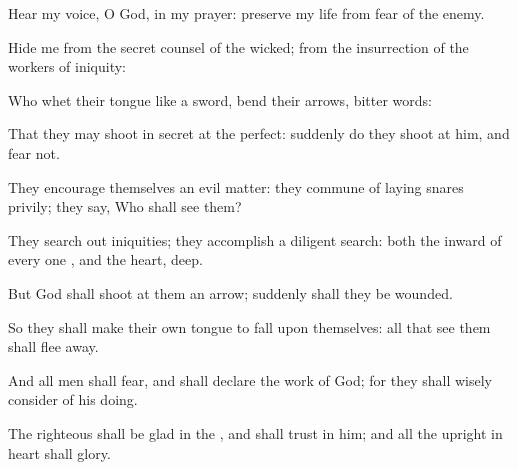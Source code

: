 {\Q {}Hear my
voice, O
God, in my
prayer:
preserve my
life from
fear of the
enemy.


\par }{\Q {}Hide me from the secret
counsel of the
wicked; from the
insurrection of the
workers of
iniquity:


\par }{\Q {}Who
whet their
tongue like a
sword,
{}
bend
{} their
arrows,
{}
bitter
words:


\par }{\Q {}That they may
shoot in
secret at the
perfect:
suddenly do they
shoot at him, and
fear not.


\par }{\Q {}They
encourage themselves
{} an
evil
matter: they
commune of
laying
snares
privily; they
say, Who shall
see them?


\par }{\Q {}They search
out
iniquities; they
accomplish a
diligent
search: both the
inward
{} of every
one
{}, and the
heart,
{}
deep.


\par }{\BB \par }
{\Q {}But
God shall
shoot at them
{} an
arrow;
suddenly shall they be
wounded.


\par }{\Q {}So they shall make their own
tongue to
fall upon themselves: all that
see them shall flee
away.


\par }{\Q {}And all
men shall
fear, and shall
declare the
work of
God; for they shall wisely
consider of his
doing.


\par }{\Q {}The
righteous shall be
glad in the
{}, and shall
trust in him; and all the
upright in
heart shall
glory.




\par }
